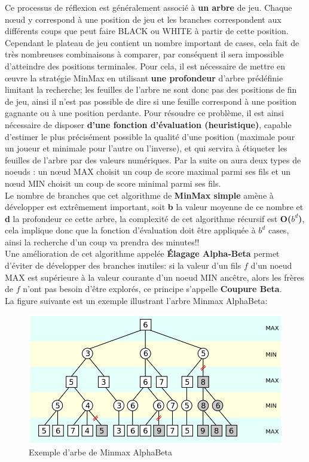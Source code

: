 \documentclass[a4paper,10pt]{article}
\begin{document}
Ce processus de réflexion est généralement associé à \textbf{un arbre} de jeu. Chaque nœud y correspond à une position de jeu  et les branches correspondent aux différents coups que peut faire BLACK ou WHITE à partir de cette position.\\
Cependant le plateau de jeu contient un nombre important de cases, cela fait de très nombreuses combinaisons à comparer, par conséquent il sera impossible d'atteindre des positions terminales. Pour cela, il est nécessaire de mettre en œuvre la stratégie MinMax en utilisant \textbf{une profondeur} d’arbre prédéfinie limitant la recherche; les feuilles de l’arbre ne sont donc pas des positions de fin de jeu, ainsi il n’est pas possible de dire si une feuille correspond à une position gagnante ou à une position perdante. Pour résoudre ce problème, il est ainsi nécessaire de disposer \textbf{d’une fonction d’évaluation (heuristique)}, capable d’estimer le plus précisément possible la qualité d’une position (maximale pour un joueur et minimale pour l'autre ou l'inverse), et qui servira à étiqueter les feuilles de l’arbre par des valeurs numériques. Par la suite on aura deux types de noeuds : un nœud MAX choisit un coup de score maximal parmi ses fils et un nœud MIN choisit un coup de score minimal parmi ses fils.\\
Le nombre de branches que cet algorithme de \textbf{MinMax simple} amène à développer est extrêmement important, soit \textbf{b} la valeur moyenne de ce nombre et \textbf{d} la profondeur ce cette arbre, la complexité de cet algorithme récursif est \textbf{O($b^d$)}, cela implique donc que la fonction d’évaluation doit être appliquée à $b^d$ cases, ainsi la recherche d'un coup va prendra des minutes!! \\

Une amélioration de cet algorithme appelée \textbf{Élagage Alpha-Beta } permet d’éviter de développer des branches inutiles: si la valeur d'un fils $f$ d'un noeud MAX est supérieure à la valeur courante d'un noeud MIN ancêtre, alors les frères de $f$ n'ont pas besoin d'être explorés, ce principe s'appelle \textbf{Coupure Beta}.\\ La figure suivante est un exemple illustrant l'arbre Minmax AlphaBeta: 
\begin{figure}[h]
\begin{center}
    \includegraphics[scale=0.34]{minmax.png}
        \caption{Exemple d'arbe de Minmax AlphaBeta}
    \label{fig:minmax}
\end{center}
\end{figure}\\
\end{document}
